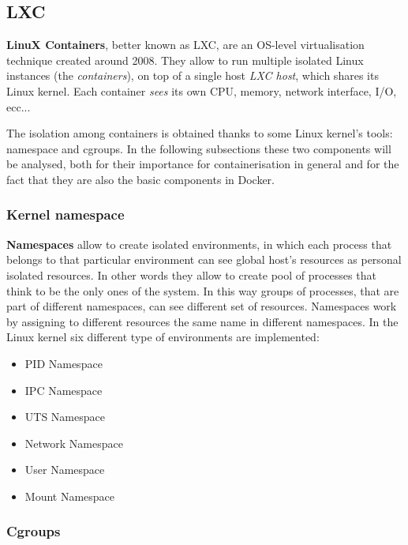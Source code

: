 \documentclass[a4paper,12pt]{article}
\begin{document}

\subsection{LXC}

\textbf{LinuX Containers}, better known as LXC, are an OS-level virtualisation
technique created around 2008. They allow to run multiple isolated Linux
instances (the \textit{containers}), on top of a single host \textit{LXC host},
which shares its Linux kernel. Each container \textit{sees} its own CPU, memory,
network interface, I/O, ecc... \par The isolation among containers is obtained
thanks to some Linux kernel's tools: namespace and cgroups. In the following
subsections these two components will be analysed, both for their importance for
containerisation in general and for the fact that they are also the basic
components in Docker.

\subsubsection{Kernel namespace}

\textbf{Namespaces} allow to create isolated environments, in which each process
that belongs to that particular environment can see global host's resources as
personal isolated resources. In other words they allow to create pool of
processes that think to be the only ones of the system. In this way groups of
processes, that are part of different namespaces, can see different set of
resources. Namespaces work by assigning to different resources the same name in
different namespaces. In the Linux kernel six different type of environments are
implemented:
  \begin{itemize}
    \item PID Namespace
    \item IPC Namespace
    \item UTS Namespace
    \item Network Namespace
    \item User Namespace
    \item Mount Namespace
  \end{itemize} 

\subsubsection{Cgroups}
\end{document}
